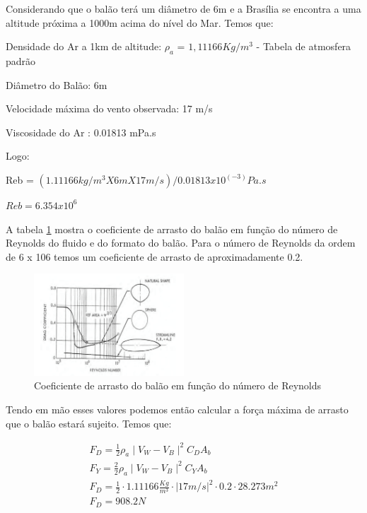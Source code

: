 	Considerando que o balão terá um diâmetro de 6m e a Brasília se encontra a uma altitude próxima a 1000m acima do nível do Mar. Temos que:

	Densidade do Ar a 1km de altitude: $\rho_{a}$ = $1,11166 Kg/m^3$ - Tabela de atmosfera padrão~\cite{bird}

	Diâmetro do Balão: 6m

	Velocidade máxima do vento observada: 17 m/s

	Viscosidade do Ar : 0.01813 mPa.s~\cite{bird}

	Logo:

	Reb = $(1.11166 kg/m^3 X 6m X 17 m/s) / 0.01813 x 10^(-3) Pa.s$

	$Reb = 6.354 x 10^6$

	A tabela \ref{img:coeficienteArrasto} mostra o coeficiente de arrasto do balão em função do número de Reynolds do fluido e do formato do balão. Para o número de Reynolds da ordem de 6 x 106  temos um coeficiente de arrasto de aproximadamente 0.2.

	\begin{figure}[H]
		\centering
		\includegraphics[width=0.5\textwidth]{figuras/coeficienteArrasto}
		\caption[Coeficiente de arrasto do balão em função do número de Reynolds do fluido e do formato do balão]{Coeficiente de arrasto do balão em função do número de Reynolds~\cite{myers}}
		\label{img:coeficienteArrasto}
	\end{figure}

	Tendo em mão esses valores podemos então calcular a força máxima de arrasto que o balão estará sujeito. Temos que:

	\begin{equacao}
		\begin{equation}
		\begin{gathered}
			F_{D} = \frac{1}{2} \rho_{a} \mid V_{W} - V_{B} \mid^{2} C_{D} A_{b}\\
			F_{Y} = \frac{2}{2} \rho_{a} \mid V_{W} - V_{B} \mid^{2} C_{Y} A_{b}\\
			F_{D} = \frac{1}{2} \cdot 1.11166 \frac{Kg}{m^{3}} \cdot \left | 17m/s \right |^{2} \cdot 0.2 \cdot 28.273m^{2}\\
			F_{D} = 908.2 N
		\end{gathered}
		\end{equation}
		\caption{Força máxima de arrasto que o balão estará sujeito}
		\label{eqn:forcaArrastoMax}
	\end{equacao}

